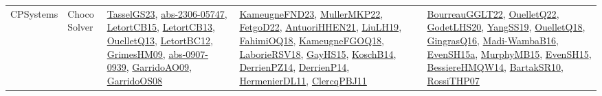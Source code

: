 {\begin{longtable}{lp{3cm}>{\raggedright}p{6cm}>{\raggedright}p{6cm}p{8cm}}
CPSystems & Choco Solver & \href{papers/TasselGS23.pdf}{TasselGS23}\cite{TasselGS23}, \href{articles/abs-2306-05747.pdf}{abs-2306-05747}\cite{abs-2306-05747}, \href{articles/LetortCB15.pdf}{LetortCB15}\cite{LetortCB15}, \href{papers/LetortCB13.pdf}{LetortCB13}\cite{LetortCB13}, \href{papers/OuelletQ13.pdf}{OuelletQ13}\cite{OuelletQ13}, \href{papers/LetortBC12.pdf}{LetortBC12}\cite{LetortBC12}, \href{papers/GrimesHM09.pdf}{GrimesHM09}\cite{GrimesHM09}, \href{articles/abs-0907-0939.pdf}{abs-0907-0939}\cite{abs-0907-0939}, \href{articles/GarridoAO09.pdf}{GarridoAO09}\cite{GarridoAO09}, \href{articles/GarridoOS08.pdf}{GarridoOS08}\cite{GarridoOS08} & \href{papers/KameugneFND23.pdf}{KameugneFND23}\cite{KameugneFND23}, \href{articles/MullerMKP22.pdf}{MullerMKP22}\cite{MullerMKP22}, \href{articles/FetgoD22.pdf}{FetgoD22}\cite{FetgoD22}, \href{papers/AntuoriHHEN21.pdf}{AntuoriHHEN21}\cite{AntuoriHHEN21}, \href{papers/LiuLH19.pdf}{LiuLH19}\cite{LiuLH19}, \href{articles/FahimiOQ18.pdf}{FahimiOQ18}\cite{FahimiOQ18}, \href{papers/KameugneFGOQ18.pdf}{KameugneFGOQ18}\cite{KameugneFGOQ18}, \href{articles/LaborieRSV18.pdf}{LaborieRSV18}\cite{LaborieRSV18}, \href{papers/GayHS15.pdf}{GayHS15}\cite{GayHS15}, \href{papers/KoschB14.pdf}{KoschB14}\cite{KoschB14}, \href{papers/DerrienPZ14.pdf}{DerrienPZ14}\cite{DerrienPZ14}, \href{papers/DerrienP14.pdf}{DerrienP14}\cite{DerrienP14}, \href{papers/HermenierDL11.pdf}{HermenierDL11}\cite{HermenierDL11}, \href{papers/ClercqPBJ11.pdf}{ClercqPBJ11}\cite{ClercqPBJ11} & \href{articles/BourreauGGLT22.pdf}{BourreauGGLT22}\cite{BourreauGGLT22}, \href{papers/OuelletQ22.pdf}{OuelletQ22}\cite{OuelletQ22}, \href{papers/GodetLHS20.pdf}{GodetLHS20}\cite{GodetLHS20}, \href{papers/YangSS19.pdf}{YangSS19}\cite{YangSS19}, \href{papers/OuelletQ18.pdf}{OuelletQ18}\cite{OuelletQ18}, \href{papers/GingrasQ16.pdf}{GingrasQ16}\cite{GingrasQ16}, \href{papers/Madi-WambaB16.pdf}{Madi-WambaB16}\cite{Madi-WambaB16}, \href{articles/EvenSH15a.pdf}{EvenSH15a}\cite{EvenSH15a}, \href{papers/MurphyMB15.pdf}{MurphyMB15}\cite{MurphyMB15}, \href{papers/EvenSH15.pdf}{EvenSH15}\cite{EvenSH15}, \href{papers/BessiereHMQW14.pdf}{BessiereHMQW14}\cite{BessiereHMQW14}, \href{articles/BartakSR10.pdf}{BartakSR10}\cite{BartakSR10}, \href{papers/RossiTHP07.pdf}{RossiTHP07}\cite{RossiTHP07}\\

\end{longtable}}
